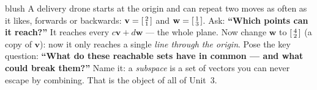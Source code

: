 \documentclass[10pt]{article}
\newcommand{\vv}{\mathbf{v}}
\newcommand{\ww}{\mathbf{w}}
\begin{document}
\begin{skillbox}[Hook]{blush}
    A delivery drone starts at the origin and can repeat two moves as often as it likes, forwards
    or backwards: $\vv=\begin{bsmallmatrix} 2\\1 \end{bsmallmatrix}$ and
    $\ww=\begin{bsmallmatrix} 1\\3 \end{bsmallmatrix}$. Ask: \textbf{``Which points can it
    reach?''} It reaches every $c\vv+d\ww$ --- the whole plane. Now change $\ww$ to
    $\begin{bsmallmatrix} 4\\2 \end{bsmallmatrix}$ (a copy of $\vv$): now it only reaches a single
    \emph{line through the origin}. Pose the key question: \textbf{``What do these reachable sets
    have in common --- and what could break them?''} Name it: a \emph{subspace} is a set of
    vectors you can never escape by combining. That is the object of all of Unit~3.
\end{skillbox}
\end{document}
